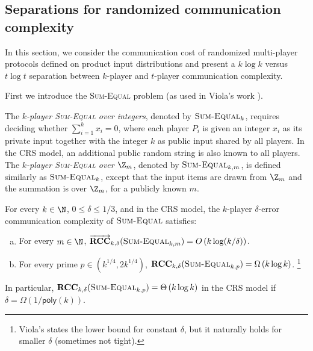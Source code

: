 \documentclass{toc}
\newcommand{\poly}{\mathsf{poly}}
\newcommand{\error}{\ensuremath{\delta}}
\newcommand{\bigo}[1]{\ensuremath{{{O} \left( {#1} \right)}}}
\newcommand{\bigomega}[1]{\ensuremath{{\Omega \left( {#1} \right)}}}
\newcommand{\bigtheta}[1]{\ensuremath{{\Theta\left({#1} \right)}}}
\newcommand{\rcc}{\ensuremath{\mathbf{RCC}}}
\newcommand{\rccone}{\ensuremath{\overrightarrow{\mathbf{RCC}}}}
\newcommand{\sumequal}{\textsc{Sum-Equal} }
\begin{document}
\subsection{Separations for randomized communication complexity}

In this section, we consider the communication cost of randomized multi-player protocols defined on product input distributions and present a $k\log k$ versus $t\log t$ separation between $k$-player and $t$-player communication complexity.

First we introduce the \sumequal problem (as used in Viola's work \cite{Viola:2013we}).

\begin{definition}
The \emph{$k$-player \sumequal over integers}, denoted by $\sumequal_k$, 
requires deciding whether $\sum_{i =1 }^{k} x_i = 0$,
where each player $P_i$ is given an integer $x_i$ as its private input together with the integer $k$ as public input shared by all players.
In the CRS model, an additional public random string is also known to all players.
%
The \emph{$k$-player \sumequal over $\Z_m$}, denoted by $\sumequal_{k,m}$, 
is defined similarly 
as $\sumequal_{k}$,
except that the input items are drawn from $\Z_m$ and the summation is over $\Z_m$,
for a publicly known $m$.
\end{definition}

\begin{lemma}
\label{lemma:Viola}
For every $k\in\N$, $0\le \error\le 1/3$, 
and in the CRS model, 
the $k$-player $\error$-error communication complexity of $\sumequal$ satisfies:

\begin{enumerate}[(a)]
    
\item For every $m\in \N$, $\rccone_{k,\error}(\sumequal_{k,m}) = \bigo{k\log (k/\error)}$.

\item For every prime $p\in(k^{1/4},2k^{1/4})$, $\rcc_{k,\error}(\sumequal_{k,p}) = \bigomega{k\log k}$.%
\footnote{Viola's states the lower bound for constant $\error$, but it naturally holds for smaller $\error$ (sometimes not tight).}
\end{enumerate}

In particular, $\rcc_{k,\error}(\sumequal_{k,p})=\bigtheta{k\log k}$ in the CRS model if $\error=\bigomega{1/\poly(k)}$.
\end{lemma}
\end{document}
